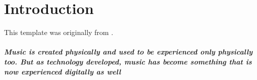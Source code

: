 \chapter{Introduction} \label{Chapter:Introduction}
This template was originally from \cite{Gunn:2001:pdflatex}.

\paragraph{
    Music is created physically and used to be experienced only physically too.
    But as technology developed, music has become something that is now experienced
    digitally as well
}